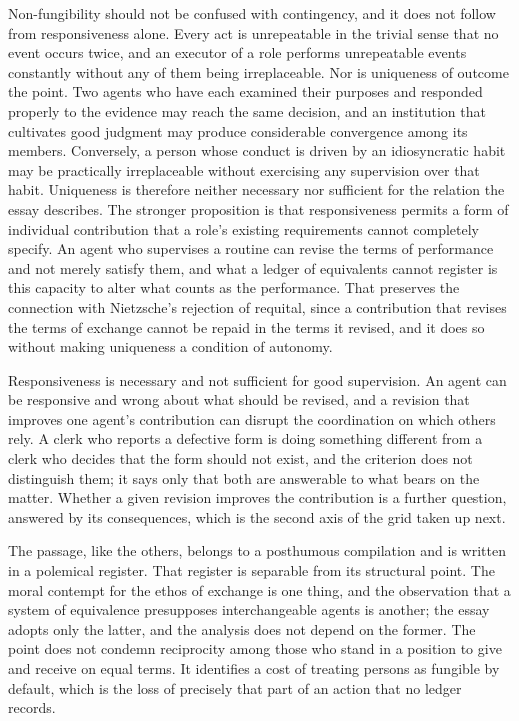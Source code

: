 \documentclass[11pt]{article}
\begin{document}
Non-fungibility should not be confused with contingency, and it does not follow from responsiveness alone. Every act is unrepeatable in the trivial sense that no event occurs twice, and an executor of a role performs unrepeatable events constantly without any of them being irreplaceable. Nor is uniqueness of outcome the point. Two agents who have each examined their purposes and responded properly to the evidence may reach the same decision, and an institution that cultivates good judgment may produce considerable convergence among its members. Conversely, a person whose conduct is driven by an idiosyncratic habit may be practically irreplaceable without exercising any supervision over that habit. Uniqueness is therefore neither necessary nor sufficient for the relation the essay describes. The stronger proposition is that responsiveness permits a form of individual contribution that a role's existing requirements cannot completely specify. An agent who supervises a routine can revise the terms of performance and not merely satisfy them, and what a ledger of equivalents cannot register is this capacity to alter what counts as the performance. That preserves the connection with Nietzsche's rejection of requital, since a contribution that revises the terms of exchange cannot be repaid in the terms it revised, and it does so without making uniqueness a condition of autonomy.

Responsiveness is necessary and not sufficient for good supervision. An agent can be responsive and wrong about what should be revised, and a revision that improves one agent's contribution can disrupt the coordination on which others rely. A clerk who reports a defective form is doing something different from a clerk who decides that the form should not exist, and the criterion does not distinguish them; it says only that both are answerable to what bears on the matter. Whether a given revision improves the contribution is a further question, answered by its consequences, which is the second axis of the grid taken up next.

The passage, like the others, belongs to a posthumous compilation and is written in a polemical register. That register is separable from its structural point. The moral contempt for the ethos of exchange is one thing, and the observation that a system of equivalence presupposes interchangeable agents is another; the essay adopts only the latter, and the analysis does not depend on the former. The point does not condemn reciprocity among those who stand in a position to give and receive on equal terms. It identifies a cost of treating persons as fungible by default, which is the loss of precisely that part of an action that no ledger records.
\end{document}
